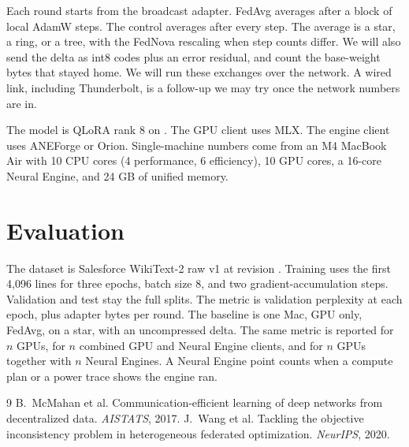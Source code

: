 \documentclass[10pt]{article}
\begin{document}
Each round starts from the broadcast adapter. FedAvg averages after a block of local AdamW steps. The control averages after every step. The average is a star, a ring, or a tree, with the FedNova rescaling when step counts differ. We will also send the delta as int8 codes plus an error residual, and count the base-weight bytes that stayed home.
We will run these exchanges over the network. A wired link, including Thunderbolt, is a follow-up we may try once the network numbers are in.

The model is QLoRA rank 8 on . The GPU client uses MLX. The engine client uses ANEForge or Orion.
Single-machine numbers come from an M4 MacBook Air with 10 CPU cores (4 performance, 6 efficiency), 10 GPU cores, a 16-core Neural Engine, and 24 GB of unified memory.

\section{Evaluation}
The dataset is Salesforce WikiText-2 raw v1 at revision . Training uses the first 4,096 lines for three epochs, batch size 8, and two gradient-accumulation steps. Validation and test stay the full splits. The metric is validation perplexity at each epoch, plus adapter bytes per round. The baseline is one Mac, GPU only, FedAvg, on a star, with an uncompressed delta. The same metric is reported for \(n\) GPUs, for \(n\) combined GPU and Neural Engine clients, and for \(n\) GPUs together with \(n\) Neural Engines. A Neural Engine point counts when a compute plan or a power trace shows the engine ran.

\begin{thebibliography}{9}
\setlength{\itemsep}{0.15em}
B.~McMahan et al. Communication-efficient learning of deep networks from decentralized data. \textit{AISTATS}, 2017.
J.~Wang et al. Tackling the objective inconsistency problem in heterogeneous federated optimization. \textit{NeurIPS}, 2020.
\end{thebibliography}
\end{document}
